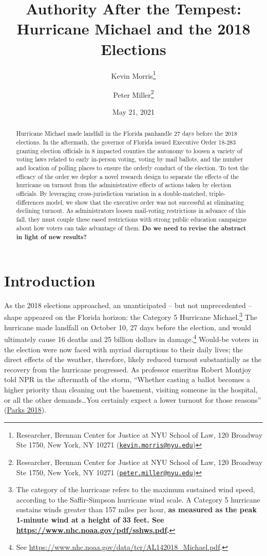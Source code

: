 \documentclass[
  12pt,
]{article}
\title{Authority After the Tempest: Hurricane Michael and the 2018 Elections}
\author{Kevin Morris\footnote{Researcher, Brennan Center for Justice at NYU School of Law, 120 Broadway Ste 1750, New York, NY 10271 (\href{mailto:kevin.morris@nyu.edu}{\nolinkurl{kevin.morris@nyu.edu}})} \and Peter Miller\footnote{Researcher, Brennan Center for Justice at NYU School of Law, 120 Broadway Ste 1750, New York, NY 10271 (\href{mailto:peter.miller@nyu.edu}{\nolinkurl{peter.miller@nyu.edu}})}}
\date{May 21, 2021}
\begin{document}
\maketitle
\begin{abstract}
Hurricane Michael made landfall in the Florida panhandle 27 days before the 2018 elections. In the aftermath, the governor of Florida issued Executive Order 18-283 granting election officials in 8 impacted counties the autonomy to loosen a variety of voting laws related to early in-person voting, voting by mail ballots, and the number and location of polling places to ensure the orderly conduct of the election. To test the efficacy of the order we deploy a novel research design to separate the effects of the hurricane on turnout from the administrative effects of actions taken by election officials. By leveraging cross-jurisdiction variation in a double-matched, triple-differences model, we show that the executive order was not successful at eliminating declining turnout. As administrators loosen mail-voting restrictions in advance of this fall, they must couple these eased restrictions with strong public education campaigns about how voters can take advantage of them. \textbf{Do we need to revise the abstract in light of new results?}
\end{abstract}

\pagebreak

\doublespacing

\hypertarget{introduction}{%
\section*{Introduction}\label{introduction}}

As the 2018 elections approached, an unanticipated -- but not unprecedented -- shape appeared on the Florida horizon: the Category 5 Hurricane Michael.\footnote{The category of the hurricane refers to the maximum sustained wind speed, according to the Saffir-Simpson hurricane wind scale. A Category 5 hurricane sustains winds greater than 157 miles per hour, \textbf{as measured as the peak 1-minute wind at a height of 33 feet. See \url{https://www.nhc.noaa.gov/pdf/sshws.pdf}.}} The hurricane made landfall on October 10, 27 days before the election, and would ultimately cause 16 deaths and 25 billion dollars in damage.\footnote{See \url{https://www.nhc.noaa.gov/data/tcr/AL142018_Michael.pdf}.} Would-be voters in the election were now faced with myriad disruptions to their daily lives; the direct effects of the weather, therefore, likely reduced turnout substantially as the recovery from the hurricane progressed. As professor emeritus Robert Montjoy told NPR in the aftermath of the storm, ``Whether casting a ballot becomes a higher priority than cleaning out the basement, visiting someone in the hospital, or all the other demands\ldots You certainly expect a lower turnout for those reasons'' (\protect\hyperlink{ref-Parks2018}{Parks 2018}).
\end{document}
